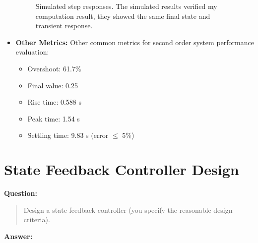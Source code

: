 \documentclass[12pt, oneside]{article}
\begin{document}
\begin{itemize}
        \begin{figure}[htbp]
          \centering
          \quad %
          \caption{Simulated step responses. The simulated results verified my computation result, they showed the same final state and transient response.}
        \end{figure}

    \item \textbf{Other Metrics:}  Other common metrics for second order system performance evaluation:
        \begin{itemize}
            \item Overshoot: 61.7\%
            \item Final value: 0.25
            \item Rise time: 0.588 s
            \item Peak time: 1.54 s
            \item Settling time: 9.83 s (error $\leq$ 5\%)
        \end{itemize}
\end{itemize}



\section{State Feedback Controller Design}
\textbf{Question:}
\begin{quote}
Design a state feedback controller (you specify the reasonable design criteria).
\end{quote}
\textbf{Answer:}
\end{document}
